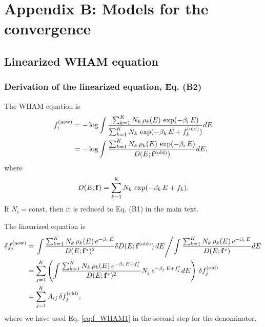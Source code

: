 \documentclass[aip,jcp,preprint,notitlepage, superscriptaddress]{revtex4-1}
\begin{document}
\section{Appendix B: Models for the convergence}






\subsection{Linearized WHAM equation}


\subsubsection{Derivation of the linearized equation, Eq. (B2)}



The WHAM equation is
%
\begin{align}
f_i^\mathrm{(new)}
&=
-\log
\int
\frac
{
  \sum_{k=1}^K
    N_k \, \rho_k(E) \, \exp(-\beta_i \, E)
}
{
  \sum_{k=1}^K
    N_k \, \exp( -\beta_k \, E + f_k^\mathrm{(old)} )
}
dE
\notag \\
&=
-\log
\int
\frac
{
  \sum_{k=1}^K N_k \, \rho_k(E) \, \exp(-\beta_i \, E)
}
{
  D(E; \mathbf{f}^\mathrm{(old)})
}
dE,
\label{eq:f_WHAM1}
\end{align}
%
where
%
\begin{align}
D(E; \mathbf{f})
=
\sum_{k=1}^K N_k \, \exp(-\beta_k \, E + f_k).
\end{align}
%
If $N_i = \mathrm{const}$, then it is reduced to Eq. (B1) in the main text.



The linearized equation is
\begin{align}
\delta f_i^\mathrm{(new)}
&=
\left.
  \int
  \frac
  {
    \sum_{k=1}^K N_k \, \rho_k(E) \, e^{-\beta_i \, E}
  }
  {
    D(E; \vct f^*)^2
  }
  \delta D(E; \vct f^\mathrm{(old)}) \,
  dE
\middle/
  \int
  \frac
  {
    \sum_{k=1}^K N_k \, \rho_k(E) \, e^{-\beta_i \, E}
  }
  {
    D(E; \vct f^*)
  }
  dE
\right.
%
\notag \\
&=
\sum_{j = 1}^K
\left(
\int
\frac
{
  \sum_{k=1}^K N_k \, \rho_k(E) \, e^{-\beta_i \, E + f_i^*}
}
{
  D(E; \vct f^*)^2
}
N_j \, e^{-\beta_j \, E + f_j^*}
dE
\right)
\, \delta f_j^\mathrm{(old)}
\notag \\
&=
\sum_{j = 1}^K
A_{ij} \, \delta f_j^\mathrm{(old)},
\label{eq:f_lin}
\end{align}
where we have used
Eq. \eqref{eq:f_WHAM1}
in the second step
for the denominator.
\end{document}
